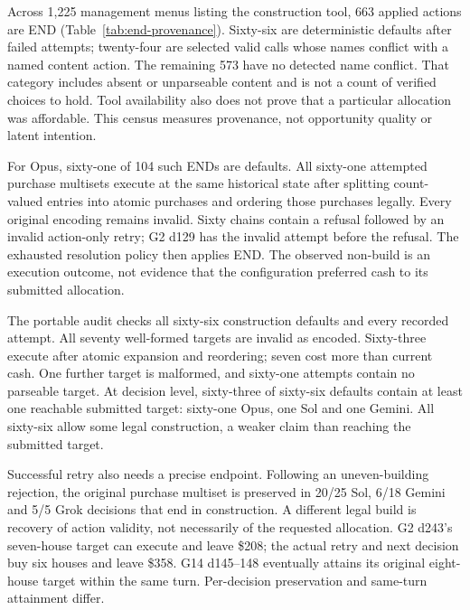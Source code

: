 Across 1,225 management menus listing the construction tool, 663 applied actions are END (Table~\ref{tab:end-provenance}). Sixty-six are deterministic defaults after failed attempts; twenty-four are selected valid calls whose names conflict with a named content action. The remaining 573 have no detected name conflict. That category includes absent or unparseable content and is not a count of verified choices to hold. Tool availability also does not prove that a particular allocation was affordable. This census measures provenance, not opportunity quality or latent intention.



For Opus, sixty-one of 104 such ENDs are defaults. All sixty-one attempted purchase multisets execute at the same historical state after splitting count-valued entries into atomic purchases and ordering those purchases legally. Every original encoding remains invalid. Sixty chains contain a refusal followed by an invalid action-only retry; G2 d129 has the invalid attempt before the refusal. The exhausted resolution policy then applies END. The observed non-build is an execution outcome, not evidence that the configuration preferred cash to its submitted allocation.



The portable audit checks all sixty-six construction defaults and every recorded attempt. All seventy well-formed targets are invalid as encoded. Sixty-three execute after atomic expansion and reordering; seven cost more than current cash. One further target is malformed, and sixty-one attempts contain no parseable target. At decision level, sixty-three of sixty-six defaults contain at least one reachable submitted target: sixty-one Opus, one Sol and one Gemini. All sixty-six allow some legal construction, a weaker claim than reaching the submitted target.

Successful retry also needs a precise endpoint. Following an uneven-building rejection, the original purchase multiset is preserved in 20/25 Sol, 6/18 Gemini and 5/5 Grok decisions that end in construction. A different legal build is recovery of action validity, not necessarily of the requested allocation. G2 d243's seven-house target can execute and leave \$208; the actual retry and next decision buy six houses and leave \$358. G14 d145--148 eventually attains its original eight-house target within the same turn. Per-decision preservation and same-turn attainment differ.

